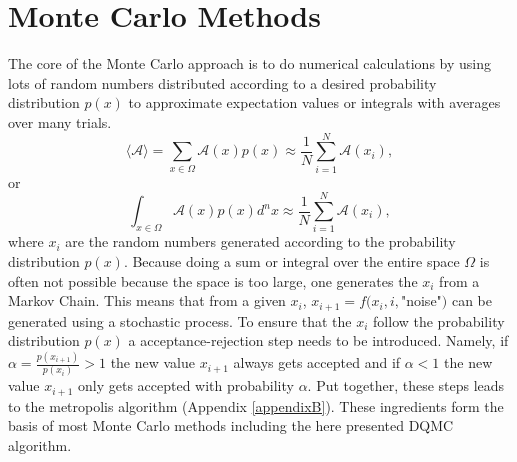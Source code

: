\documentclass [12pt]{report}
\begin{document}
\section{Monte Carlo Methods}
The core of the Monte Carlo approach is to do numerical calculations by using lots of random numbers distributed according to a desired probability distribution $p(x)$ to approximate expectation values or integrals with averages over many trials.
\begin{equation}
\langle \mathcal{A} \rangle = \sum_{x \in \Omega} \mathcal{A}(x) p(x) \approx \frac{1}{N} \sum_{i=1}^N \mathcal{A}(x_i),
\end{equation}
or
\begin{equation}
\int_{x \in \Omega} \mathcal{A}(x) p(x) d^n x \approx \frac{1}{N} \sum_{i=1}^N \mathcal{A}(x_i),
\end{equation}
where $x_i$ are the random numbers generated according to the probability distribution $p(x)$. Because doing a sum or integral over the entire space $\Omega$ is often not possible because the space is too large, one generates the $x_i$ from a Markov Chain. This means that from a given $x_i$, $x_{i+1} = f(x_i,i,$"noise"$)$ can be generated using a stochastic process. To ensure that the $x_i$ follow the probability distribution $p(x)$ a acceptance-rejection step needs to be introduced. Namely, if $\alpha = \frac{p(x_{i+1})}{p(x_i)} > 1$ the new value $x_{i+1}$ always gets accepted and if $\alpha < 1$ the new value $x_{i+1}$ only gets accepted with probability $\alpha$. Put together, these steps leads to the metropolis algorithm (Appendix \ref{appendixB}). These ingredients form the basis of most Monte Carlo methods including the here presented DQMC algorithm.
\end{document}
